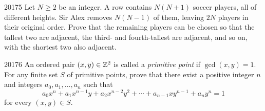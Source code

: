 \begin{problem}{2017}{5}
Let $N\geq2$ be an integer. A row contains $N(N+1)$ soccer players, all of different heights. Sir Alex removes $N(N-1)$ of them, leaving $2N$ players in their original order. Prove that the remaining players can be chosen so that the tallest two are adjacent, the third- and fourth-tallest are adjacent, and so on, with the shortest two also adjacent.
\end{problem}

\begin{problem}{2017}{6}
An ordered pair $(x, y)\in\mathbb{Z}^2$ is called a \emph{primitive point} if $\gcd(x, y)=1$. For any finite set $S$ of primitive points, prove that there exist a positive integer $n$ and integers $a_0, a_1, \dots, a_n$ such that
\[
    a_0x^n+a_1x^{n-1}y+a_2x^{n-2}y^2+\cdots+a_{n-1}xy^{n-1}+a_ny^n=1
\]
for every $(x, y)\in S$.
\end{problem}
